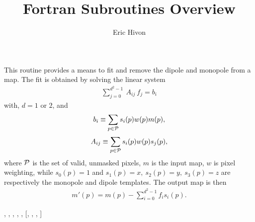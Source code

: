 
\sloppy


\title{\healpix Fortran Subroutines Overview}
 \section[remove\_dipole*]{ }
\label{sub:remove_dipole}
\author{Eric Hivon}
\newcommand{\vecf}{{\rm{ \bf f}}}
\newcommand{\vecb}{{\rm{ \bf b}}}
\newcommand{\matA}{{\rm{ \bf A}}}
\newcommand{\calP}{\cal{P}}

\begin{facility}
{This routine provides a means to fit and remove the dipole and monopole
from a \healpix map. The fit is obtained by solving the linear system
\begin{eqnarray}
	\sum_{j=0}^{d^2-1}\ A_{ij}\ f_j = b_i
\end{eqnarray}
 with, $d=1$ or $2$, and
\begin{eqnarray}
	b_i \equiv \sum_{p \in \calP} s_i(p) w(p) m(p),
\end{eqnarray}
\begin{eqnarray}
	A_{ij} \equiv \sum_{p \in \calP} s_i(p) w(p) s_j(p),
\end{eqnarray}
 where $\calP$ is the set of
valid, unmasked pixels, $m$ is the input map, $w$ is pixel weighting, while
$s_0(p) = 1$ and $s_1(p)=x,\ s_2(p)=y,\ s_3(p)=z$ are
respectively the monopole and dipole templates. The output map is then
\begin{eqnarray}
	m'(p) = m(p) - \sum_{i=0}^{d^2-1} f_i s_i(p).
\end{eqnarray}
}
{\modPixTools}
\end{facility}

\begin{f90format}
{%
, %
, %
, %
, %
, %
 [, %
, %
, %
]}
\end{f90format}

